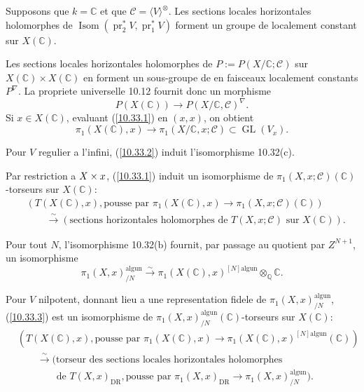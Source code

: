\documentclass[12pt,a4paper]{article}
\theoremstyle{plain}
\theoremstyle{definition}
\theoremstyle{remark}
\DeclareMathOperator{\Isom}{Isom}
\DeclareMathOperator{\GL}{GL}
\DeclareMathOperator{\pr}{pr}
\newcommand{\Q}{\mathbb{Q}}
\newcommand{\C}{\mathbb{C}}
\newcommand{\DR}{\mathrm{DR}}
\newcommand{\alg}{\mathrm{alg}}
\newcommand{\un}{\mathrm{un}}
\begin{document}
Supposons que $k = \C$ et que $\mathcal{C} = \langle V \rangle^{\otimes}$. Les sections locales horizontales holomorphes de $\Isom(\pr_2^* V, \pr_1^* V)$ forment un groupe de localement constant sur $X(\C)$.

Les sections locales horizontales holomorphes de $P := P(X/\C; \mathcal{C})$ sur $X(\C) \times X(\C)$ en forment un sous-groupe de en faisceaux localement constants $P^\nabla$. La propriete universelle 10.12 fournit donc un morphisme
\begin{equation}\label{10.33.1}
P(X(\C)) \longrightarrow P(X/\C, \mathcal{C})^\nabla. \tag{10.33.1}
\end{equation}
Si $x \in X(\C)$, evaluant (\ref{10.33.1}) en $(x, x)$, on obtient
\begin{equation}\label{10.33.2}
\pi_1(X(\C), x) \longrightarrow \pi_1(X/\C, x; \mathcal{C}) \subset \GL(V_x). \tag{10.33.2}
\end{equation}

Pour $V$ regulier a l'infini, (\ref{10.33.2}) induit l'isomorphisme 10.32(c).

Par restriction a $X \times \\{x\\}$, (\ref{10.33.1}) induit un isomorphisme de $\pi_1(X, x; \mathcal{C})(\C)$-torseurs sur $X(\C)$:
\begin{equation}\label{10.33.3}
\begin{aligned}
&(T(X(\C), x), \text{pousse par } \pi_1(X(\C), x) \to \pi_1(X, x; \mathcal{C})(\C)) \\
&\qquad \xrightarrow{\sim} (\text{sections horizontales holomorphes de } T(X, x; \mathcal{C}) \text{ sur } X(\C)).
\end{aligned} \tag{10.33.3}
\end{equation}

Pour tout $N$, l'isomorphisme 10.32(b) fournit, par passage au quotient par $Z^{N+1}$, un isomorphisme
\begin{equation}\label{10.33.4}
\pi_1(X, x)^{\alg \un}_{/N} \xrightarrow{\sim} \pi_1(X(\C), x)^{[N] \alg \un} \otimes_{\Q} \C. \tag{10.33.4}
\end{equation}

Pour $V$ nilpotent, donnant lieu a une representation fidele de $\pi_1(X, x)^{\alg \un}_{/N}$, (\ref{10.33.3}) est un isomorphisme de $\pi_1(X, x)^{\alg \un}_{/N}(\C)$-torseurs sur $X(\C)$:
\begin{equation}\label{10.33.5}
\begin{aligned}
&(T(X(\C), x), \text{pousse par } \pi_1(X(\C), x) \to \pi_1(X(\C), x)^{[N] \alg \un}(\C)) \\
&\qquad \xrightarrow{\sim} (\text{torseur des sections locales horizontales holomorphes} \\
&\qquad\qquad \text{de } T(X, x)_{\DR}, \text{pousse par } \pi_1(X, x)_{\DR} \to \pi_1(X, x)^{\alg \un}_{/N}).
\end{aligned} \tag{10.33.5}
\end{equation}
\end{document}
